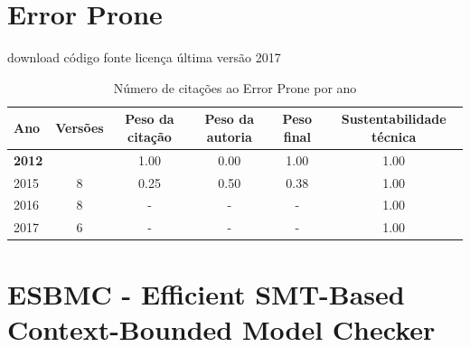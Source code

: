 \section{Error Prone}
\checkmark download
\checkmark código fonte
\checkmark licença
\checkmark última versão 2017


\begin{table}[H]
\caption{Número de citações ao Error Prone por ano}
\centering
\begin{tabular}{| l | c | c | c | c | c |}
  \hline
  Ano & Versões & Peso da citação & Peso da autoria & Peso final & Sustentabilidade técnica \\
  \hline
            {\bf 2012}
          &
          
          &
          1.00
          &
          0.00
          &
          1.00
          &
            {\color{blue} 1.00}
          \\
\hline
            2015
          &
          8
          &
          0.25
          &
          0.50
          &
          0.38
          &
            {\color{blue} 1.00}
          \\
\hline
        2016 & 8 & - & - & -
        &
          {\color{blue} 1.00}
        \\
\hline
        2017 & 6 & - & - & -
        &
          {\color{blue} 1.00}
        \\
\hline
\end{tabular}
\end{table}



\section{ESBMC - Efficient SMT-Based Context-Bounded Model Checker}



